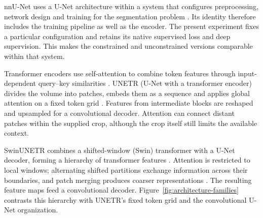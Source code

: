 \documentclass[12pt,a4paper]{article}
\begin{document}
nnU-Net uses a U-Net architecture within a system that configures
preprocessing, network design and training for the segmentation problem
\cite{isensee2021nnunet}. Its identity therefore includes the training
pipeline as well as the encoder. The present experiment fixes a particular
configuration and retains its native supervised loss and deep supervision.
This makes the constrained and unconstrained versions comparable within
that system.

Transformer encoders use self-attention to combine token features through
input-dependent query--key similarities \cite{vaswani2017attention}.
UNETR (U-Net with a transformer encoder) divides the volume into
patches, embeds them as a sequence and
applies global attention on a fixed token grid
\cite{hatamizadeh2021unetr}. Features from intermediate blocks are
reshaped and upsampled for a convolutional decoder. Attention can connect
distant patches within the supplied crop, although the crop itself still
limits the available context.

SwinUNETR combines a shifted-window (Swin) transformer with a U-Net
decoder, forming a hierarchy of transformer features
\cite{hatamizadeh2022swin}. Attention is restricted to local windows;
alternating shifted partitions exchange information across their
boundaries, and patch merging produces coarser representations
\cite{liu2021swin}. The resulting feature maps feed a convolutional
decoder. Figure~\ref{fig:architecture-families} contrasts this hierarchy
with UNETR's fixed token grid and the convolutional U-Net organization.
\end{document}

